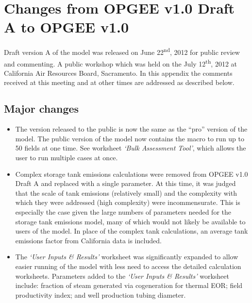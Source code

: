 \documentclass[11pt]{report}
\newcommand{\sheet}[1]{\textit{`{#1}'}}
\begin{document}
{{{{%
\section{Changes from OPGEE v1.0 Draft A to OPGEE v1.0}

Draft version A of the model was released on June 22\textsuperscript{nd}, 2012 for public review and commenting. A public workshop which was held on the July 12\textsuperscript{th}, 2012 at California Air Resources Board, Sacramento. In this appendix the comments received at this meeting and at other times are addressed as described below.

\subsection{Major changes} 

\begin{itemize}

\item The version released to the public is now the same as the ``pro'' version of the model. The public version of the model now contains the macro to run up to 50 fields at one time. See worksheet \sheet{Bulk Assessment Tool}, which allows the user to run multiple cases at once.

\item Complex storage tank emissions calculations were removed from OPGEE v1.0 Draft A and replaced with a single parameter. At this time, it was judged that the scale of tank emissions (relatively small) and the complexity with which they were addressed (high complexity) were incommensurate. This is especially the case given the large numbers of parameters needed for the storage tank emissions model, many of which would not likely be available to users of the model. In place of the complex tank calculations, an average tank emissions factor from California data is included.

\item The \sheet{User Inputs \& Results} worksheet was significantly expanded to allow easier running of the model with less need to access the detailed calculation worksheets. Parameters added to the \sheet{User Inputs \& Results} worksheet include: fraction of steam generated via cogeneration for thermal EOR; field productivity index; and well production tubing diameter.


\end{itemize}}}}}
\end{document}
